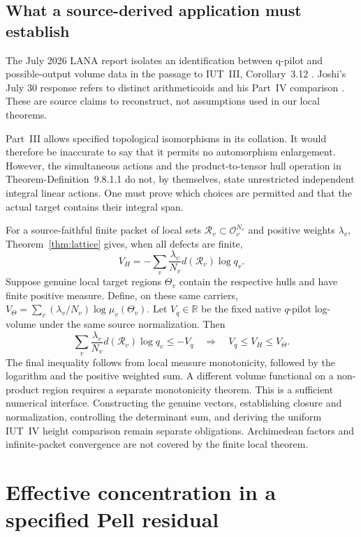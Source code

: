 \documentclass[11pt]{amsart}
\theoremstyle{definition}
\theoremstyle{remark}
\newcommand{\R}{\mathbb R}
\newcommand{\OO}{\mathcal O}
\begin{document}
\subsection{What a source-derived application must establish}
The July 2026 LANA report \cite{LANA} isolates an identification between
q-pilot and possible-output volume data in the passage to IUT~III,
Corollary~3.12 \cite{IUT3}. Joshi's July 30 response \cite{JoshiResponse}
refers to distinct arithmeticoids and his Part~IV comparison
\cite[Theorem~6.10.1]{JoshiIV}. These are source claims to reconstruct,
not assumptions used in our local theorems.

Part~III \cite[Proposition~9.7.5.1]{JoshiIII} allows specified topological
isomorphisms in its collation. It would therefore be inaccurate to say
that it permits no automorphism enlargement. However, the simultaneous
actions and the product-to-tensor hull operation in
Theorem-Definition~9.8.1.1 do not, by themselves, state unrestricted
independent integral linear actions. One must prove which choices are
permitted and that the actual target contains their integral span.

For a source-faithful finite packet of local sets
$\mathcal R_v\subset\OO_v^{N_v}$ and positive weights $\lambda_v$,
Theorem~\ref{thm:lattice} gives, when all defects are finite,
\[
 V_H=-\sum_v\frac{\lambda_v}{N_v}d(\mathcal R_v)\log q_v.
\]
Suppose genuine local target regions $\Theta_v$ contain the respective
hulls and have finite positive measure. Define, on these same carriers,
$V_\Theta=\sum_v(\lambda_v/N_v)\log\mu_v(\Theta_v)$.
Let $V_q\in\R$ be the fixed native $q$-pilot log-volume under the same
source normalization. Then
\[
 \sum_v\frac{\lambda_v}{N_v}d(\mathcal R_v)\log q_v\le -V_q
 \quad\Longrightarrow\quad V_q\le V_H\le V_\Theta.
\]
The final inequality follows from local measure monotonicity, followed by
the logarithm and the positive weighted sum. A different volume functional
on a non-product region requires a separate monotonicity theorem.
This is a sufficient numerical interface. Constructing the genuine vectors,
establishing closure and normalization, controlling the determinant sum,
and deriving the uniform IUT~IV height comparison \cite{IUT4} remain
separate obligations. Archimedean factors and infinite-packet convergence
are not covered by the finite local theorem.

\section{Effective concentration in a specified Pell residual}\label{sec:pell}
\end{document}
